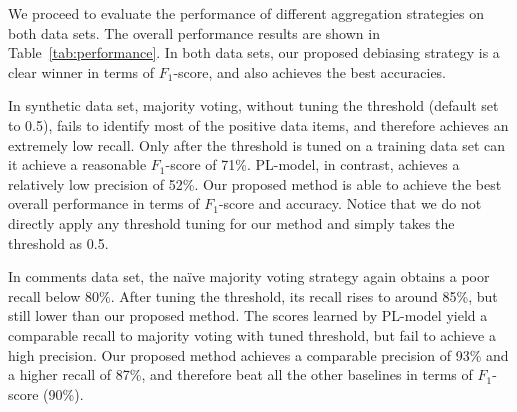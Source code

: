 We proceed to evaluate the performance of different aggregation strategies on both data sets.  
The overall performance results are shown in Table~\ref{tab:performance}.  
In both data sets, our proposed debiasing strategy is a clear winner in terms of $F_1$-score, 
and also achieves the best accuracies.  

In synthetic data set, majority voting, without tuning the threshold (default set to 0.5), fails to identify most of the positive data items, 
and therefore achieves an extremely low recall.  
Only after the threshold is tuned on a training data set 
can it achieve a reasonable $F_1$-score of 71\%.  
PL-model, in contrast, achieves a relatively low precision of 52\%.  
Our proposed method is able to achieve the best overall performance in terms of $F_1$-score and accuracy.  
Notice that we do not directly apply any threshold tuning for our method and simply takes the threshold as 0.5.  

In comments data set, the na\"{i}ve majority voting strategy again obtains a poor recall below 80\%.
After tuning the threshold, its recall rises to around 85\%, but still lower than our proposed method.  
The scores learned by PL-model yield a comparable recall to majority voting with tuned threshold, 
but fail to achieve a high precision.  
Our proposed method achieves a comparable precision of 93\% and a higher recall of 87\%, 
and therefore beat all the other baselines in terms of $F_1$-score (90\%).  





